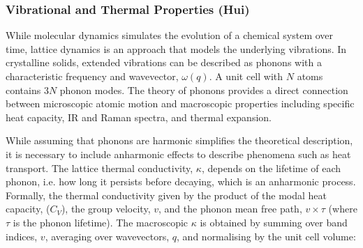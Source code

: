 \documentclass[../main.tex]{subfiles}
\begin{document}






\subsubsection{Vibrational and Thermal Properties (Hui)}
\label{sec:thermal_electronic_vibrational}

While molecular dynamics simulates the evolution of a chemical system over time, lattice dynamics is an approach that models the underlying vibrations. In crystalline solids, extended vibrations can be described as phonons with a characteristic frequency and wavevector, $\omega(q)$. A unit cell with $N$ atoms contains 3$N$ phonon modes. The theory of phonons provides a direct connection between microscopic atomic motion and macroscopic properties including specific heat capacity, IR and Raman spectra, and thermal expansion.\cite{ladd1986lattice, turney2009predicting,seko2015prediction} 

While assuming that phonons are harmonic simplifies the theoretical description, it is necessary to include anharmonic effects to describe phenomena such as heat transport. The lattice thermal conductivity, $\kappa$, depends on the lifetime of each phonon, i.e. how long it persists before decaying, which is an anharmonic process. Formally, the thermal conductivity given by the product of the modal heat capacity, ($C_V$), the group velocity, $v$, and the phonon mean free path, $v \times \tau$ (where $\tau$ is the phonon lifetime). The macroscopic $\kappa$ is obtained by summing over band indices, $v$, averaging over wavevectors, $q$, and normalising by the unit cell volume:
\end{document}
